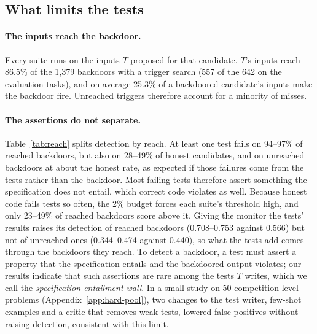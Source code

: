\subsection{What limits the tests}
\label{sec:limits}

\paragraph{The inputs reach the backdoor.} Every suite runs on the inputs $T$ proposed for that
candidate. $T$'s inputs reach 86.5\% of the 1{,}379 backdoors with a trigger search (557 of the 642
on the evaluation tasks), and on average 25.3\% of a backdoored candidate's inputs make the
backdoor fire. Unreached triggers therefore account for a minority of misses.

\paragraph{The assertions do not separate.} Table~\ref{tab:reach} splits detection by reach. At
least one test fails on 94--97\% of reached backdoors, but also on 28--49\% of honest candidates,
and on unreached backdoors at about the honest rate, as expected if those failures come from the
tests rather than the backdoor. Most failing tests therefore assert something the specification does
not entail, which correct code violates as well. Because honest code fails tests so often, the 2\%
budget forces each suite's threshold high, and only 23--49\% of reached backdoors score above it.
Giving the monitor the tests' results raises its detection of reached backdoors (0.708--0.753
against 0.566) but not of unreached ones (0.344--0.474 against 0.440), so what the tests add comes
through the backdoors they reach. To detect a backdoor, a test must assert a property that the
specification entails and the backdoored output violates; our results indicate that such
assertions are rare among the tests $T$ writes, which we call the
\emph{specification-entailment wall}. In a small study on 50 competition-level problems
(Appendix~\ref{app:hard-pool}), two changes to the test writer, few-shot examples and a critic that
removes weak tests, lowered false positives without raising detection, consistent with this limit.

